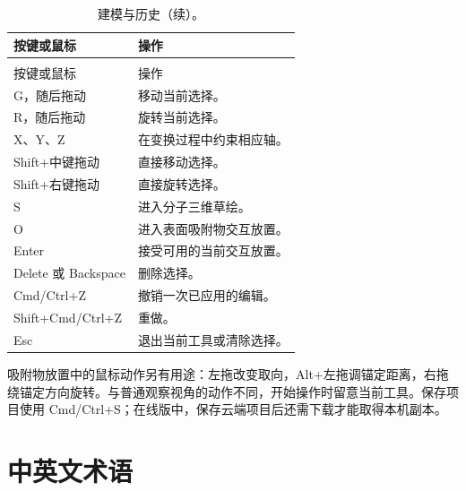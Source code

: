 \begin{longtable}{>{\raggedright\arraybackslash}p{.37\linewidth}>{\raggedright\arraybackslash}p{}}
\caption{建模与历史。}\\
\toprule
按键或鼠标 & 操作 \\
\midrule
\endfirsthead
\caption[]{建模与历史（续）。}\\
\toprule
按键或鼠标 & 操作 \\
\midrule
\endhead
\bottomrule
\endfoot
\bottomrule
\endlastfoot
G，随后拖动 & 移动当前选择。\\
R，随后拖动 & 旋转当前选择。\\
X、Y、Z & 在变换过程中约束相应轴。\\
Shift+中键拖动 & 直接移动选择。\\
Shift+右键拖动 & 直接旋转选择。\\
S & 进入分子三维草绘。\\
O & 进入表面吸附物交互放置。\\
Enter & 接受可用的当前交互放置。\\
Delete 或 Backspace & 删除选择。\\
Cmd/Ctrl+Z & 撤销一次已应用的编辑。\\
Shift+Cmd/Ctrl+Z & 重做。\\
Esc & 退出当前工具或清除选择。\\
\end{longtable}

吸附物放置中的鼠标动作另有用途：左拖改变取向，Alt+左拖调锚定距离，右拖绕锚定方向旋转。与普通观察视角的动作不同，开始操作时留意当前工具。保存项目使用 Cmd/Ctrl+S；在线版中，保存云端项目后还需下载才能取得本机副本。

\Needspace{145mm}
\section{中英文术语}

